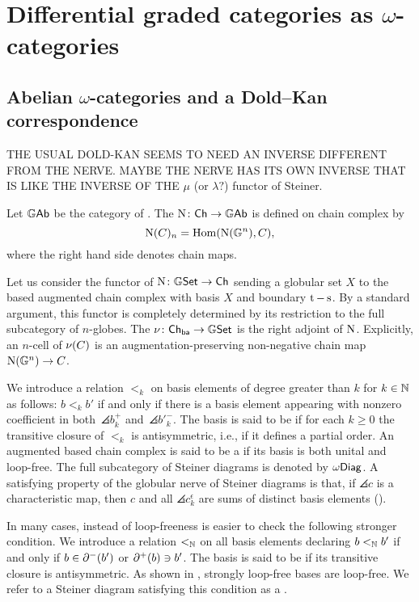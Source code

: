 
\section{Differential graded categories as $\omega$-categories}

\subsection{Abelian $\omega$-categories and a Dold--Kan correspondence}

THE USUAL DOLD-KAN SEEMS TO NEED AN INVERSE DIFFERENT FROM THE NERVE. MAYBE THE NERVE HAS ITS OWN INVERSE THAT IS LIKE THE INVERSE OF THE $\mu$ (or $\lambda?$) functor of Steiner.

\SS Let $\mathbb{G}\mathsf{Ab}$ be the category of .
The  $\operatorname{N} \colon \mathsf{Ch} \to \mathbb{G}\mathsf{Ab}$ is defined on chain complex by
\[
\operatorname{N}(C)_n = \mathrm{Hom}(\operatorname{N}(\mathbb{G}^n), C),
\]  
where the right hand side denotes chain maps.

\SS Let us consider the functor of  $\operatorname{N} \colon \mathbb{G}\mathsf{Set} \to \mathsf{Ch}$ sending a globular set $X$ to the based augmented chain complex with basis $X$ and boundary $\operatorname{t} - \operatorname{s}$.
By a standard argument, this functor is completely determined by its restriction to the full subcategory of $n$-globes.
The  $\nu \colon \mathsf{Ch}_{\mathsf{ba}} \to \mathbb{G}\mathsf{Set}$ is the right adjoint of $\operatorname{N}$.
Explicitly, an $n$-cell of $\nu(C)$ is an augmentation-preserving non-negative chain map $\operatorname{N}(\mathbb{G}^n) \to C$.

\SS\label{def:Steiner-diagram}
We introduce a relation $<_k$ on basis elements of degree greater than $k$ for $k \in \mathbb{N}$ as follows:
$b <_k b'$ if and only if there is a basis element appearing with nonzero coefficient in both~$\angles{b}^+_k$ and~$\angles{b'}^-_k$.
The basis is said to be  if for each $k \geq 0$ the transitive closure of $<_k$ is antisymmetric, i.e., if it defines a partial order.
An augmented based chain complex is said to be a  if its basis is both unital and loop-free.
The full subcategory of Steiner diagrams is denoted by $\omega\mathsf{Diag}$.
A satisfying property of the globular nerve of Steiner diagrams is that, if $\angles{c}$ is a characteristic map, then $c$ and all $\angles{c}_k^\epsilon$ are sums of distinct basis elements (\cite[Thm.~4.1]{steiner2012opetopes}).

In many cases, instead of loop-freeness is easier to check the following stronger condition.
We introduce a relation $<_{\mathbb{N}}$ on all basis elements declaring $b <_{\mathbb{N}} b'$ if and only if $b \in \partial^-(b')$ or $\partial^+(b) \ni b'$.
The basis is said to be  if its transitive closure is antisymmetric.
As shown in \cite[Prop.~3.7]{steiner2004omega}, strongly loop-free bases are loop-free.
We refer to a Steiner diagram satisfying this condition as a .

